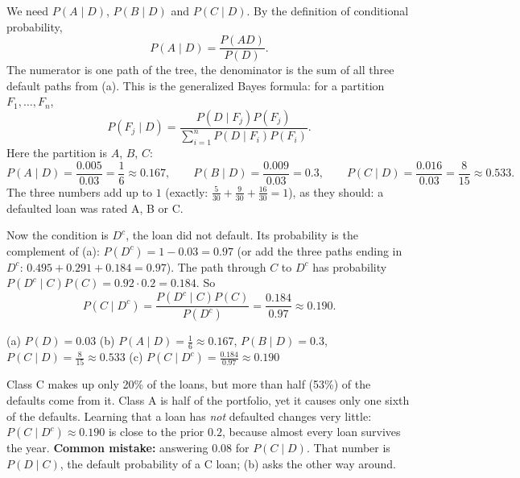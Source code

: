 \begin{solution}
	 We need $P(A\mid D)$, $P(B\mid D)$ and $P(C\mid D)$. By the
	definition of conditional probability,
	\[ P(A\mid D)=\frac{P(AD)}{P(D)}. \]
	The numerator is one path of the tree, the denominator is the sum of all three
	default paths from (a). This is the generalized Bayes formula: for a
	partition $F_1,\dots,F_n$,
	\[ P(F_j\mid D)=\frac{P(D\mid F_j)P(F_j)}{\sum_{i=1}^{n}P(D\mid F_i)P(F_i)}. \]
	Here the partition is $A$, $B$, $C$:
	\[ P(A\mid D)=\frac{0.005}{0.03}=\frac16\approx0.167,\qquad
		P(B\mid D)=\frac{0.009}{0.03}=0.3,\qquad
		P(C\mid D)=\frac{0.016}{0.03}=\frac{8}{15}\approx0.533. \]
	The three numbers add up to $1$ (exactly: $\frac{5}{30}+\frac{9}{30}+
		\frac{16}{30}=1$), as they should: a defaulted loan was rated A, B or C.

	 Now the condition is $D^c$, the loan did not default. Its
	probability is the complement of (a): $P(D^c)=1-0.03=0.97$ (or add the
	three paths ending in $D^c$: $0.495+0.291+0.184=0.97$). The path through
	$C$ to $D^c$ has probability $P(D^c\mid C)P(C)=0.92\cdot0.2=0.184$. So
	\[ P(C\mid D^c)=\frac{P(D^c\mid C)P(C)}{P(D^c)}=\frac{0.184}{0.97}
		\approx0.190. \]
	\begin{answer}
		(a) $P(D)=0.03$ \quad (b) $P(A\mid D)=\frac16\approx0.167$,
		$P(B\mid D)=0.3$, $P(C\mid D)=\frac{8}{15}\approx0.533$ \quad
		(c) $P(C\mid D^c)=\frac{0.184}{0.97}\approx0.190$
	\end{answer}
	\begin{remark}
		Class C makes up only 20\% of the loans, but more than half (53\%) of the
		defaults come from it. Class A is half of the portfolio, yet it causes
		only one sixth of the defaults. Learning that a loan has \emph{not}
		defaulted changes very little: $P(C\mid D^c)\approx0.190$ is close to
		the prior $0.2$, because almost every loan survives the year.
		\textbf{Common mistake:} answering $0.08$ for $P(C\mid D)$. That number
		is $P(D\mid C)$, the default probability of a C loan; (b) asks the other
		way around.
	\end{remark}
\end{solution}
